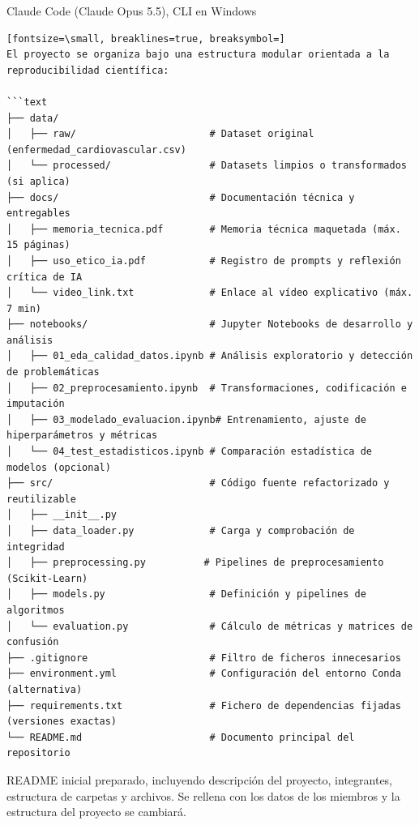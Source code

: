 \documentclass[12pt,a4paper,oneside]{book}
\begin{document}
\begin{iaresp}{Claude Code (Claude Opus 5.5), CLI en Windows}
\begin{Verbatim}[fontsize=\small, breaklines=true, breaksymbol=]
El proyecto se organiza bajo una estructura modular orientada a la reproducibilidad científica:

```text
├── data/
│   ├── raw/                       # Dataset original (enfermedad_cardiovascular.csv)
│   └── processed/                 # Datasets limpios o transformados (si aplica)
├── docs/                          # Documentación técnica y entregables
│   ├── memoria_tecnica.pdf        # Memoria técnica maquetada (máx. 15 páginas)
│   ├── uso_etico_ia.pdf           # Registro de prompts y reflexión crítica de IA
│   └── video_link.txt             # Enlace al vídeo explicativo (máx. 7 min)
├── notebooks/                     # Jupyter Notebooks de desarrollo y análisis
│   ├── 01_eda_calidad_datos.ipynb # Análisis exploratorio y detección de problemáticas
│   ├── 02_preprocesamiento.ipynb  # Transformaciones, codificación e imputación
│   ├── 03_modelado_evaluacion.ipynb# Entrenamiento, ajuste de hiperparámetros y métricas
│   └── 04_test_estadisticos.ipynb # Comparación estadística de modelos (opcional)
├── src/                           # Código fuente refactorizado y reutilizable
│   ├── __init__.py
│   ├── data_loader.py             # Carga y comprobación de integridad
│   ├── preprocessing.py          # Pipelines de preprocesamiento (Scikit-Learn)
│   ├── models.py                  # Definición y pipelines de algoritmos
│   └── evaluation.py              # Cálculo de métricas y matrices de confusión
├── .gitignore                     # Filtro de ficheros innecesarios
├── environment.yml                # Configuración del entorno Conda (alternativa)
├── requirements.txt               # Fichero de dependencias fijadas (versiones exactas)
└── README.md                      # Documento principal del repositorio
\end{Verbatim}
\end{iaresp}
\begin{iaanalisis}
README inicial preparado, incluyendo descripción del proyecto, integrantes, estructura de carpetas y archivos. Se rellena con los datos de los miembros y la estructura del proyecto se cambiará.
\end{iaanalisis}
\end{document}
